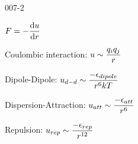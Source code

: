 \begin{mitframe}{007-2} %

    
    
    \begin{listone}
    
      \item $\force = -\dfrac{\mathrm{d}\forcepot}{\mathrm{d}\pos}$
      

      \item Coulombic interaction: $\forcepot \sim \dfrac{\charge{i} \charge{j}}{\pos}$

      \item Dipole-Dipole: $\forcepot_{d-d} \sim \dfrac{-\dielec_{dipole}}{\pos^6\thermcond\Temp}$
      
      

      \item Dispersion-Attraction: $\forcepot_{att} \sim \dfrac{-\dielec_{att}}{\pos^6}$

      \item Repulsion: $\forcepot_{rep} \sim \dfrac{-\dielec_{rep}}{\pos^{12}}$
      
    
    \end{listone}
 
\end{mitframe}